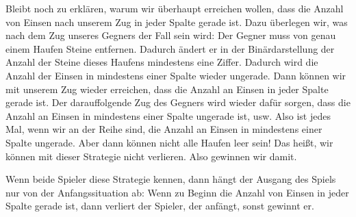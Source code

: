 \documentclass[a4paper,ngerman,12pt]{scrartcl}
\theoremstyle{definition}
\begin{document}
Bleibt noch zu erklären, warum wir überhaupt erreichen wollen, dass die Anzahl von Einsen nach unserem Zug in jeder Spalte gerade ist. Dazu überlegen wir, was nach dem Zug unseres Gegners der Fall sein wird: Der Gegner muss von genau einem Haufen Steine entfernen. Dadurch ändert er in der Binärdarstellung der Anzahl der Steine dieses Haufens mindestens eine Ziffer. Dadurch wird die Anzahl der Einsen in mindestens einer Spalte wieder ungerade. Dann können wir mit unserem Zug wieder erreichen, dass die Anzahl an Einsen in jeder Spalte gerade ist. Der darauffolgende Zug des Gegners wird wieder dafür sorgen, dass die Anzahl an Einsen in mindestens einer Spalte ungerade ist, usw. Also ist jedes Mal, wenn wir an der Reihe sind, die Anzahl an Einsen in mindestens einer Spalte ungerade. Aber dann können nicht alle Haufen leer sein! Das heißt, wir können mit dieser Strategie nicht verlieren. Also gewinnen wir damit.

Wenn beide Spieler diese Strategie kennen, dann hängt der Ausgang des Spiels nur von der Anfangssituation ab: Wenn zu Beginn die Anzahl von Einsen in jeder Spalte gerade ist, dann verliert der Spieler, der anfängt, sonst gewinnt er.
\end{document}
